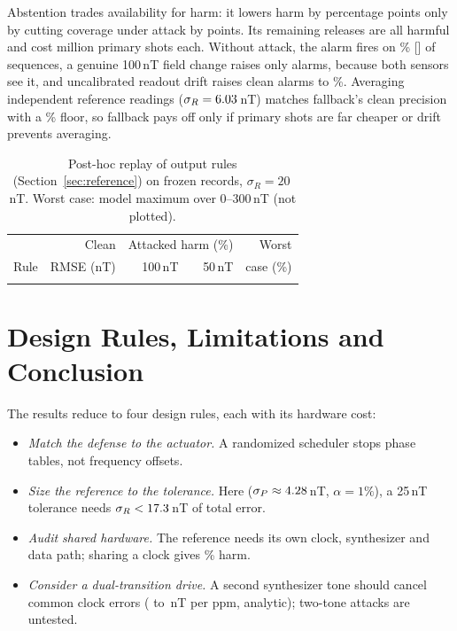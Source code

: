\documentclass[conference,9pt]{IEEEtran}
\begin{document}
Abstention trades availability for harm: it lowers harm by \ObsPFourDiff{} percentage points only
by cutting coverage under attack by \ObsPFiveDiff{} points. Its \AbstainAttackH{} remaining releases are all harmful and cost \AbstainShotsMillions{} million
primary shots each. Without attack, the alarm fires on \CleanAlarmRate\% [\CleanAlarmCI] of sequences, a genuine 100\,nT field change raises only \GenuineAlarmCount{} alarms, because both sensors see it,
and uncalibrated readout drift raises clean alarms to \MismatchAlarmRate\%. Averaging \TheoryAvgReadings{} independent reference readings ($\sigma_R=6.03$\,nT) matches
fallback's clean precision with a \TheoryAvgFloor\% floor, so fallback pays off only if primary shots
are far cheaper or drift prevents averaging.

\begin{table}[t]
\centering
\caption{Post-hoc replay of output rules (Section~\ref{sec:reference}) on frozen records,
$\sigma_R=20$\,nT. Worst case: model maximum over 0--300\,nT (not plotted).}
\label{tab:fusion}
\footnotesize
\setlength{\tabcolsep}{3pt}
\begin{tabular}{@{}lrrrr@{}}
\toprule
& Clean & \multicolumn{2}{c}{Attacked harm (\%)} & Worst \\
Rule & RMSE (nT) & 100\,nT & 50\,nT & case (\%) \\
\midrule

\\
\bottomrule
\end{tabular}
\end{table}

\section{Design Rules, Limitations and Conclusion}
\label{sec:rules}

The results reduce to four design rules, each with its hardware cost:
\begin{itemize}
\item \emph{Match the defense to the actuator.} A randomized scheduler stops phase tables, not
frequency offsets.
\item \emph{Size the reference to the tolerance.} Here ($\sigma_P\approx4.28$\,nT,
$\alpha=1\%$), a 25\,nT tolerance needs $\sigma_R<17.3$\,nT of total error.
\item \emph{Audit shared hardware.} The reference needs its own clock, synthesizer and data path;
sharing a clock gives \FullHarmRate\% harm.
\item \emph{Consider a dual-transition drive.} A second synthesizer tone should cancel common clock
errors (\ClockSingleBias{} to \ClockDualBias{}\,nT per ppm, analytic); two-tone attacks are untested.
\end{itemize}
\end{document}
